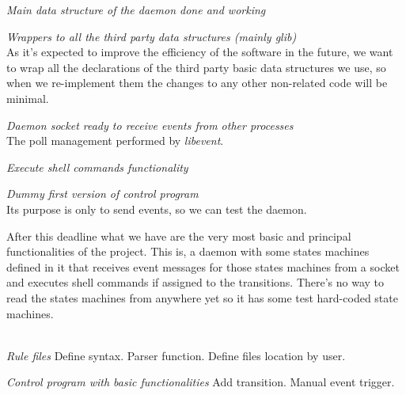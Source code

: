 \begin{list}{-}{February 16th, 2012 ({\bf 14 days})}
  \item \emph{Main data structure of the daemon done and working}
  \item \emph{Wrappers to all the third party data structures (mainly glib)}\\
    As it's expected to improve the efficiency of the software in the 
    future, we want to wrap all the declarations of the third 
    party basic data structures we use, so when we re-implement them
    the changes to any other non-related code will be minimal.
  \item \emph{Daemon socket ready to receive events from other processes}\\
    The poll management performed by \emph{libevent}.
  \item \emph{Execute shell commands functionality}
  \item \emph{Dummy first version of control program}\\
    Its purpose is only to send events, so we can test the daemon.
\end{list}
After this deadline what we have are the very most basic and principal 
functionalities of the project. This is, a daemon with some states machines 
defined in it that receives event messages for those states machines from a 
socket and executes shell commands if assigned to the transitions.
There's no way to read the states machines from anywhere yet so it has some test 
hard-coded state machines.\\
\\
\begin{list}{-}{February 29th, 2012 ({\bf 13 days})}
  \item \emph{Rule files} %
    \subitem Define syntax.
    \subitem Parser function.
    \subitem Define files location by user.
\end{list}
\begin{list}{-}{March 9th, 2012 ({\bf 9 days})}
  \item \emph{Control program with basic functionalities}
    \subitem Add transition.
    \subitem Manual event trigger.
\end{list}
